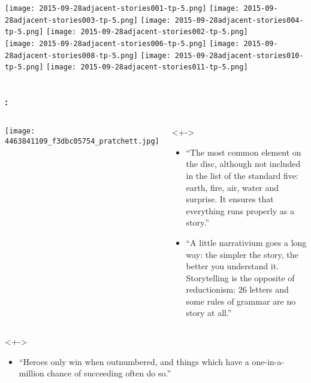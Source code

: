 \begin{frame}
\begin{block}
\begin{columns}
      \texttt{[image: 2015-09-28adjacent-stories001-tp-5.png]}
      \texttt{[image: 2015-09-28adjacent-stories003-tp-5.png]}
      \texttt{[image: 2015-09-28adjacent-stories004-tp-5.png]}
      \texttt{[image: 2015-09-28adjacent-stories002-tp-5.png]}\\
      \texttt{[image: 2015-09-28adjacent-stories006-tp-5.png]}
      \texttt{[image: 2015-09-28adjacent-stories008-tp-5.png]}
      \texttt{[image: 2015-09-28adjacent-stories010-tp-5.png]}
      \texttt{[image: 2015-09-28adjacent-stories011-tp-5.png]}
    \end{columns}
  \end{block}

\end{frame}


\begin{frame}
  \small
  \frametitle{
    :
  }

  \begin{columns}
    \texttt{[image: 4463841109\_f3dbc05754\_pratchett.jpg]}
    \begin{block}<+->{}
      \begin{itemize}
      \item<+-> 
        ``The most common element on the disc, although not
        included in the list of the standard five: earth, fire, air,
        water and surprise. It ensures that everything runs properly
        as a story.''
      \item<+->
        ``A little narrativium goes a long way: the simpler the story,
        the better you understand it. Storytelling is the opposite of
        reductionism: 26 letters and some rules of grammar are no story
        at all.''
      \end{itemize}
    \end{block}
  \end{columns}

  \begin{block}<+->{}
    \begin{itemize}
    \item
      ``Heroes only win when outnumbered, and things which have a
      one-in-a-million chance of succeeding often do so.''
    \end{itemize}
  \end{block}

\end{frame}

